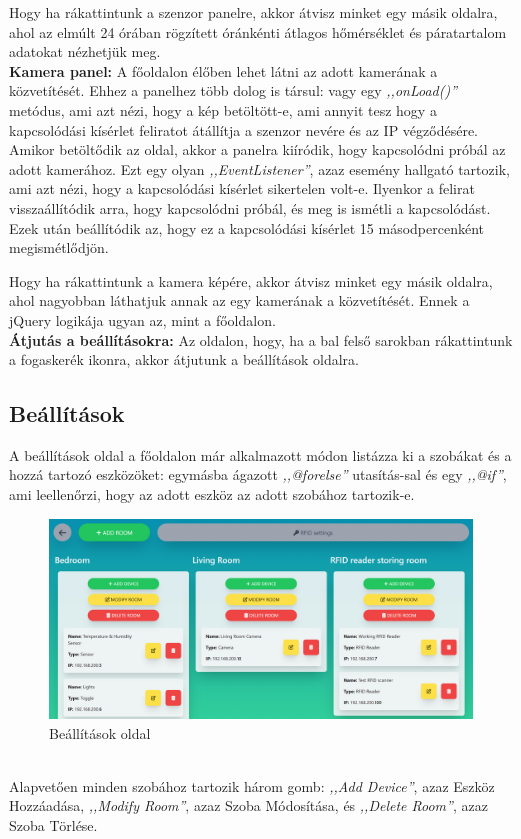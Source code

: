 \documentclass[
]{thesis-ekf}
\theoremstyle{definition}
\theoremstyle{remark}
\begin{document}
	Hogy ha rákattintunk a szenzor panelre, akkor átvisz minket egy másik oldalra, ahol az elmúlt 24 órában rögzített óránkénti átlagos hőmérséklet és páratartalom adatokat nézhetjük meg.
	\\
	\textbf{Kamera panel:}
	A főoldalon élőben lehet látni az adott kamerának a közvetítését. Ehhez a panelhez több dolog is társul: vagy egy \emph{,,onLoad()''} metódus, ami azt nézi, hogy a kép betöltött-e, ami annyit tesz hogy a kapcsolódási kísérlet feliratot átállítja a szenzor nevére és az IP végződésére. Amikor betöltődik az oldal, akkor a panelra kiíródik, hogy kapcsolódni próbál az adott kamerához. Ezt egy olyan \emph{,,EventListener''}, azaz esemény hallgató tartozik, ami azt nézi, hogy a kapcsolódási kísérlet sikertelen volt-e. Ilyenkor a felirat visszaállítódik arra, hogy kapcsolódni próbál, és meg is ismétli a kapcsolódást. Ezek után beállítódik az, hogy ez a kapcsolódási kísérlet 15 másodpercenként megismétlődjön. 
	
	Hogy ha rákattintunk a kamera képére, akkor átvisz minket egy másik oldalra, ahol nagyobban láthatjuk annak az egy kamerának a közvetítését. Ennek a jQuery logikája ugyan az, mint a főoldalon.\\
	\textbf{Átjutás a beállításokra:}
	Az oldalon, hogy, ha a bal felső sarokban rákattintunk a fogaskerék ikonra, akkor átjutunk a beállítások oldalra.
	\subsection{Beállítások}
	A beállítások oldal a főoldalon már alkalmazott módon listázza ki a szobákat és a hozzá tartozó eszközöket: egymásba ágazott \emph{,,@forelse''} utasítás-sal és egy \emph{,,@if''}, ami leellenőrzi, hogy az adott eszköz az adott szobához tartozik-e. 
	\begin{figure}[ht!]
		\centering
		\includegraphics[width=1\textwidth]{./src/pages_img/settings}
		\caption{Beállítások oldal}
		\label{settings}
	\end{figure}\\
	Alapvetően minden szobához tartozik három gomb: \emph{,,Add Device''}, azaz Eszköz Hozzáadása, \emph{,,Modify Room''}, azaz Szoba Módosítása, és \emph{,,Delete Room''}, azaz Szoba Törlése. 
	
\end{document}
